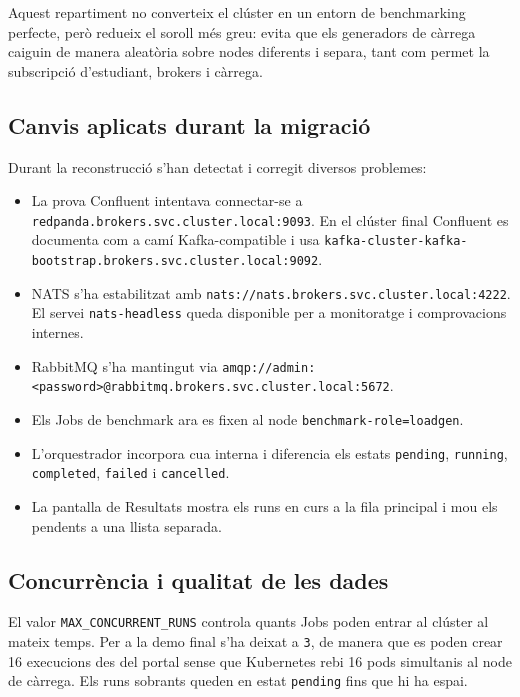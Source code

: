 Aquest repartiment no converteix el clúster en un entorn de benchmarking
perfecte, però redueix el soroll més greu: evita que els generadors de càrrega
caiguin de manera aleatòria sobre nodes diferents i separa, tant com permet la
subscripció d'estudiant, brokers i càrrega.

\subsection{Canvis aplicats durant la migració}

Durant la reconstrucció s'han detectat i corregit diversos problemes:

\begin{itemize}
  \item La prova Confluent intentava connectar-se a
        \texttt{redpanda.brokers.svc.cluster.local:9093}. En el clúster final
        Confluent es documenta com a camí Kafka-compatible i usa
        \texttt{kafka-cluster-kafka-bootstrap.brokers.svc.cluster.local:9092}.
  \item NATS s'ha estabilitzat amb \texttt{nats://nats.brokers.svc.cluster.local:4222}.
        El servei \texttt{nats-headless} queda disponible per a monitoratge i
        comprovacions internes.
  \item RabbitMQ s'ha mantingut via
        \texttt{amqp://admin:<password>@rabbitmq.brokers.svc.cluster.local:5672}.
  \item Els Jobs de benchmark ara es fixen al node
        \texttt{benchmark-role=loadgen}.
  \item L'orquestrador incorpora cua interna i diferencia els estats
        \texttt{pending}, \texttt{running}, \texttt{completed},
        \texttt{failed} i \texttt{cancelled}.
  \item La pantalla de Resultats mostra els runs en curs a la fila principal i
        mou els pendents a una llista separada.
\end{itemize}

\subsection{Concurrència i qualitat de les dades}

El valor \texttt{MAX\_CONCURRENT\_RUNS} controla quants Jobs poden entrar al
clúster al mateix temps. Per a la demo final s'ha deixat a \texttt{3}, de manera
que es poden crear 16 execucions des del portal sense que Kubernetes rebi 16
pods simultanis al node de càrrega. Els runs sobrants queden en estat
\texttt{pending} fins que hi ha espai.

